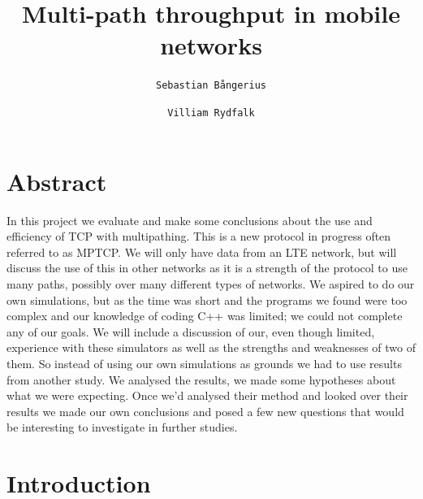 \documentclass[11pt,twocolumn]{article}
\author{
  \texttt{Sebastian Bångerius}
  \and
  \texttt{Villiam Rydfalk}
}
\begin{document}

\title{Multi-path throughput in mobile networks}
\maketitle

\cleardoublepage


\section{Abstract}

In this project we evaluate and make some conclusions about the use and efficiency of TCP with multipathing. This is a new protocol in progress often referred to as MPTCP. We will only have data from an LTE network, but will discuss the use of this in other networks as it is a strength of the protocol to use many paths, possibly over many different types of networks. We aspired to do our own simulations, but as the time was short and the programs we found were too complex and our knowledge of coding C++ was limited; we could not complete any of our goals. We will include a discussion of our, even though limited, experience with these simulators as well as the strengths and weaknesses of two of them. So instead of using our own simulations as grounds we had to use results from another study. \cite{MPTCP-LTE} We analysed the results, we made some hypotheses about what we were expecting. Once we'd analysed their method and looked over their results we made our own conclusions and posed a few new questions that would be interesting to investigate in further studies.



\section{Introduction}
\end{document}
